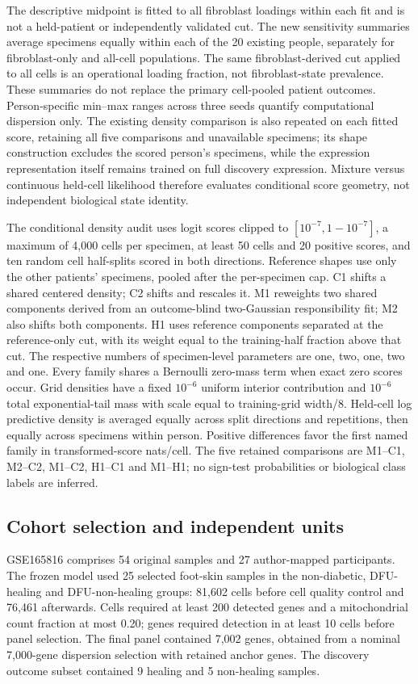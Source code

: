 \documentclass[10pt,a4paper]{article}
\begin{document}
The descriptive midpoint is fitted to all fibroblast loadings within each fit and is not a held-patient or independently validated cut. The new sensitivity summaries average specimens equally within each of the 20 existing people, separately for fibroblast-only and all-cell populations. The same fibroblast-derived cut applied to all cells is an operational loading fraction, not fibroblast-state prevalence. These summaries do not replace the primary cell-pooled patient outcomes. Person-specific min--max ranges across three seeds quantify computational dispersion only. The existing density comparison is also repeated on each fitted score, retaining all five comparisons and unavailable specimens; its shape construction excludes the scored person's specimens, while the expression representation itself remains trained on full discovery expression. Mixture versus continuous held-cell likelihood therefore evaluates conditional score geometry, not independent biological state identity.

The conditional density audit uses logit scores clipped to $[10^{-7},1-10^{-7}]$, a maximum of 4,000 cells per specimen, at least 50 cells and 20 positive scores, and ten random cell half-splits scored in both directions. Reference shapes use only the other patients' specimens, pooled after the per-specimen cap. C1 shifts a shared centered density; C2 shifts and rescales it. M1 reweights two shared components derived from an outcome-blind two-Gaussian responsibility fit; M2 also shifts both components. H1 uses reference components separated at the reference-only cut, with its weight equal to the training-half fraction above that cut. The respective numbers of specimen-level parameters are one, two, one, two and one. Every family shares a Bernoulli zero-mass term when exact zero scores occur. Grid densities have a fixed $10^{-6}$ uniform interior contribution and $10^{-6}$ total exponential-tail mass with scale equal to training-grid width/8. Held-cell log predictive density is averaged equally across split directions and repetitions, then equally across specimens within person. Positive differences favor the first named family in transformed-score nats/cell. The five retained comparisons are M1--C1, M2--C2, M1--C2, H1--C1 and M1--H1; no sign-test probabilities or biological class labels are inferred.
\subsection{Cohort selection and independent units}
GSE165816 comprises 54 original samples and 27 author-mapped participants. The frozen model used 25 selected foot-skin samples in the non-diabetic, DFU-healing and DFU-non-healing groups: 81,602 cells before cell quality control and 76,461 afterwards. Cells required at least 200 detected genes and a mitochondrial count fraction at most 0.20; genes required detection in at least 10 cells before panel selection. The final panel contained 7,002 genes, obtained from a nominal 7,000-gene dispersion selection with retained anchor genes. The discovery outcome subset contained 9 healing and 5 non-healing samples.
\end{document}
